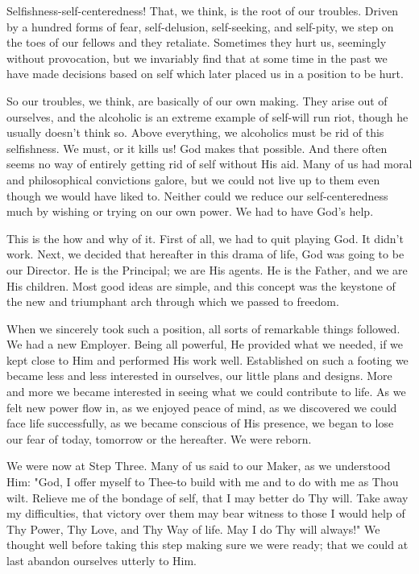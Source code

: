 \begin{biblechapter}
\verse Selfishness-self-centeredness!
\verse That, we think, is the root of our troubles.
\verse Driven by a hundred forms of 
    fear, self-delusion, self-seeking, and self-pity, 
    we step on the toes of our fellows and they retaliate.
\verse Sometimes they hurt us, seemingly without provocation, 
    but we invariably find that at some time in the past 
    we have made decisions based on self 
    which later placed us in a position to be hurt.

\verse So our troubles, we think, are basically of our own making.
\verse They arise out of ourselves, 
    and the alcoholic is an extreme example of self-will run riot, 
    though he usually doesn't think so.
\verse Above everything, we alcoholics must be rid of this selfishness.
\verse We must, or it kills us!
\verse God makes that possible.
\verse And there often seems no way of entirely getting rid of self 
    without His aid.
\verse Many of us had moral and philosophical convictions galore, 
    but we could not live up to them 
    even though we would have liked to.
\verse Neither could we reduce our self-centeredness much 
    by wishing or trying on our own power.
\verse We had to have God's help.

\verse This is the how and why of it.
\verse First of all, we had to quit playing God.
\verse It didn't work.
\verse Next, we decided that hereafter in this drama of life, 
    God was going to be our Director.
\verse He is the Principal; we are His agents.
\verse He is the Father, and we are His children.
\verse Most good ideas are simple, 
    and this concept was the keystone of the new 
    and triumphant arch through which we passed to freedom.

\verse When we sincerely took such a position, 
    all sorts of remarkable things followed.
\verse We had a new Employer.
\verse Being all powerful, 
    He provided what we needed, 
    if we kept close to Him 
    and performed His work well.
\verse Established on such a footing 
    we became less and less interested in ourselves, 
    our little plans and designs.
\verse More and more we became interested in seeing 
    what we could contribute to life.
\verse As we felt new power flow in, 
    as we enjoyed peace of mind, 
    as we discovered we could face life successfully, 
    as we became conscious of His presence, 
    we began to lose our fear of today, tomorrow or the hereafter.
\verse We were reborn.

\verse We were now at Step Three.
\verse Many of us said to our Maker, as we understood Him: 
    "God, I offer myself to Thee-to 
    build with me and to do with me as Thou wilt.  
    Relieve me of the bondage of self, 
    that I may better do Thy will.
    Take away my difficulties, 
    that victory over them may bear witness 
    to those I would help of Thy Power, Thy Love, and Thy Way of life.
    May I do Thy will always!"
\verse We thought well before taking this step making sure we were ready; 
    that we could at last abandon ourselves utterly to Him.


\end{biblechapter}
